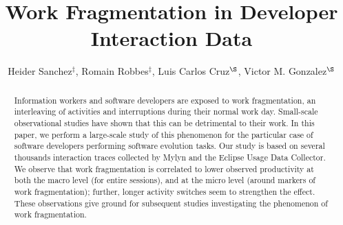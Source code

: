 \documentclass[times]{smrauth}
\begin{document}
%


\title{ Work Fragmentation in Developer Interaction Data}

\author{Heider Sanchez$^{\ddagger}$, Romain Robbes$^{\ddagger}$, Luis Carlos Cruz$^{\S}$, Victor M. Gonzalez$^{\S}$}

\address{$^{\ddagger}$: Computer Science Department (DCC), University of Chile, Chile;
$^{\S}$: Instituto Tecnologico Autonomo de Mexico, Mexico}


\maketitle





\begin{abstract}
Information workers and software developers are exposed to work fragmentation, an interleaving of activities and interruptions during their normal work day. Small-scale observational studies have shown that this can be detrimental to their work. In this paper, we perform a large-scale study of this phenomenon for the particular case of software developers performing software evolution tasks. Our study is based on several thousands interaction traces collected by Mylyn and the Eclipse Usage Data Collector. We observe that work fragmentation is correlated to lower observed productivity at both the macro level (for entire sessions), and at the micro level (around markers of work fragmentation); further, longer activity switches seem to strengthen the effect. These observations give ground for subsequent studies investigating the phenomenon of work fragmentation.
\end{abstract}


\end{document}
